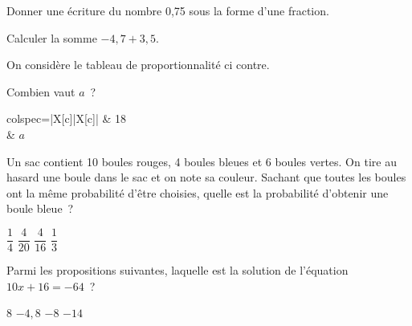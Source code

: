 \documentclass[A5]{dnbqcm}
\begin{document}
\qcmquestion
    Donner une écriture du nombre 0,75 sous la forme d'une fraction.

    \medskip\qcmquestion
    Calculer la somme $-4,7+3,5$.

    \medskip\qcmquestion
    \begin{minipage}[c]{.6\linewidth}
        On considère le tableau de proportionnalité ci
        contre.\smallskip\par\noindent Combien vaut $a$~?
    \end{minipage}\hskip10pt
    \begin{minipage}[c]{.3\linewidth}
        \begin{tblr}
            {colspec={|X[c]|X[c]|}}
             & 18\\
             & $a$\\
            \hline
        \end{tblr}
    \end{minipage}

    \medskip\qcmquestion
    Un sac contient 10 boules rouges, 4 boules bleues et 6 boules vertes.
    On tire au hasard une boule dans le sac et on note sa couleur.
    Sachant que toutes les boules ont la même probabilité d'être choisies,
    quelle est la probabilité d'obtenir une boule bleue~?%
    \begin{qcmquestions}
        \qcmitem $\dfrac14$ \hskip20pt
        \qcmitem $\dfrac4{20}$ \hskip20pt
        \qcmitem $\dfrac4{16}$ \hskip20pt
        \qcmitem $\dfrac13$ \hskip20pt
    \end{qcmquestions}

    \medskip\qcmquestion
    Parmi les propositions suivantes, laquelle est la solution de
    l'équation $10x+16=-64$~?
    \begin{qcmquestions}
        \qcmitem $8$ \hskip20pt
        \qcmitem $-4,8$ \hskip20pt
        \qcmitem $-8$ \hskip20pt
        \qcmitem $-14$ \hskip20pt
    \end{qcmquestions}
\end{document}
